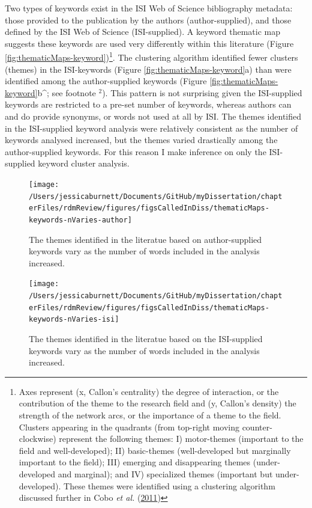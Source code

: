 \documentclass[12pt,twoside,openany]{reedthesis}
\begin{document}
Two types of keywords exist in the ISI Web of Science bibliography metadata: those provided to the publication by the authors (author-supplied), and those defined by the ISI Web of Science (ISI-supplied). A keyword thematic map suggests these keywords are used very differently within this literature (Figure \ref{fig:thematicMaps-keyword})\footnote{Axes represent (x, Callon's centrality) the degree of interaction, or the contribution of the theme to the research field and (y, Callon's density) the strength of the network arcs, or the importance of a theme to the field. Clusters appearing in the quadrants (from top-right moving counter-clockwise) represent the following themes: I) motor-themes (important to the field and well-developed); II) basic-themes (well-developed but marginally important to the field); III) emerging and disappearing themes (under-developed and marginal); and IV) specialized themes (important but under-developed). These themes were identified using a clustering algorithm discussed further in Cobo \emph{et al.} (\protect\hyperlink{ref-cobo2011approach}{2011})}. The clustering algorithm identified fewer clusters (themes) in the ISI-keywords (Figure \ref{fig:thematicMaps-keyword}a) than were identified among the author-supplied keywords (Figure \ref{fig:thematicMaps-keyword}b\^{}; see footnote \(^2\)). This pattern is not surprising given the ISI-supplied keywords are restricted to a pre-set number of keywords, whereas authors can and do provide synonyms, or words not used at all by ISI. The themes identified in the ISI-supplied keyword analysis were relatively consistent as the number of keywords analysed increased, but the themes varied drastically among the author-supplied keywords. For this reason I make inference on only the ISI-supplied keyword cluster analysis.
\begin{figure}
\texttt{[image: /Users/jessicaburnett/Documents/GitHub/myDissertation/chapterFiles/rdmReview/figures/figsCalledInDiss/thematicMaps-keywords-nVaries-author]} \caption{The themes identified in the literatue based on author-supplied keywords vary as the number of words included in the analysis increased.}\label{fig:thematicMaps-keyword-author}
\end{figure}
\begin{figure}
\texttt{[image: /Users/jessicaburnett/Documents/GitHub/myDissertation/chapterFiles/rdmReview/figures/figsCalledInDiss/thematicMaps-keywords-nVaries-isi]} \caption{The themes identified in the literatue based on the ISI-supplied keywords vary as the number of words included in the analysis increased.}\label{fig:thematicMaps-keyword-isi}
\end{figure}
\end{document}
